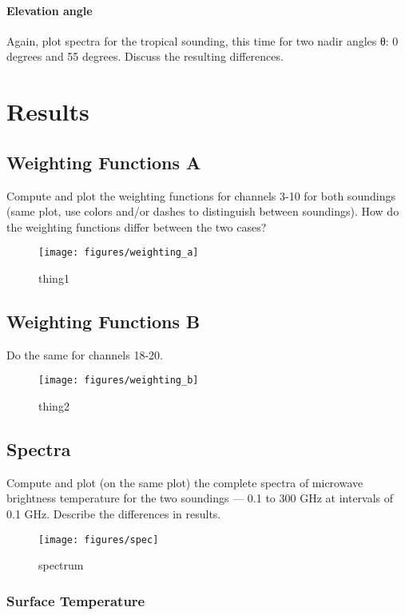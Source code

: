 \documentclass[twocol]{ametsoc}
\begin{document}
\paragraph{Elevation angle}
Again, plot spectra for the tropical sounding, this time for two nadir angles θ:  0 degrees and 55 degrees.  Discuss the resulting differences.

\section{Results}

\subsection{Weighting Functions A}
Compute and plot the weighting functions for channels 3-10 for both soundings (same plot, use colors and/or dashes to distinguish between soundings).  How do the weighting functions differ between the two cases?

\begin{figure}
	\centering
	\texttt{[image: figures/weighting\_a]}
	\caption{thing1}
	\label{fig:weighting_a}
\end{figure}

\subsection{Weighting Functions B}
Do the same for channels 18-20.

\begin{figure}
	\centering
	\texttt{[image: figures/weighting\_b]}
	\caption{thing2}
	\label{fig:weighting_b}
\end{figure}

\subsection{Spectra}
Compute and plot (on the same plot) the complete spectra of microwave brightness temperature for the two soundings — 0.1 to 300 GHz at intervals of 0.1 GHz.   Describe the differences in results.


\begin{figure}
	\centering
	\texttt{[image: figures/spec]}
	\caption{spectrum}
	\label{fig:spec}
\end{figure}

\subsubsection{Surface Temperature}
\end{document}
